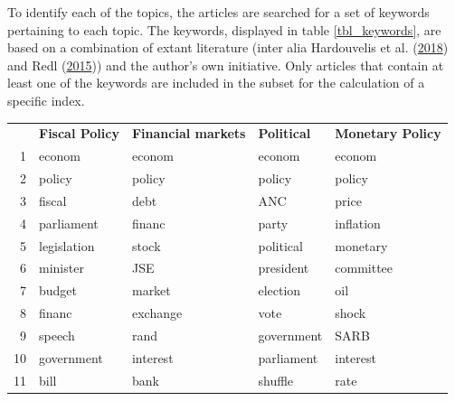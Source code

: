 \documentclass[11pt,preprint, authoryear]{elsarticle}
\let\origtable\table
\let\endorigtable\endtable
\renewenvironment{table}[1][2] {
    \expandafter\origtable\expandafter[H]
} {
    \endorigtable
}
\numberwithin{equation}{section}
\numberwithin{figure}{section}
\numberwithin{table}{section}
\begin{document}
To identify each of the topics, the articles are searched for a set of keywords
pertaining to each topic. The keywords, displayed in table
\ref{tbl_keywords}, are based on a combination of extant
literature (inter alia Hardouvelis et al.
(\protect\hyperlink{ref-Hardouvelis2018}{2018}) and Redl
(\protect\hyperlink{ref-Redl2015}{2015})) and the author's own initiative. Only
articles that contain at least one of the keywords are included in the
subset for the calculation of a specific index.

\begin{table}[H]\footnotesize
	\caption{Keywords per Index category \label{tbl_keywords}} 
	\centering
	\begin{tabular}{rlrrr}
		\cmidrule{2-5}          & \textbf{Fiscal Policy } & \multicolumn{1}{l}{\textbf{Financial markets }} & \multicolumn{1}{l}{\textbf{Political}} & \multicolumn{1}{l}{\textbf{Monetary Policy }} \\
		\cmidrule{2-5}    1     & econom & \multicolumn{1}{l}{econom} & \multicolumn{1}{l}{econom} & \multicolumn{1}{l}{econom} \\
		2     & policy & \multicolumn{1}{l}{policy} & \multicolumn{1}{l}{policy} & \multicolumn{1}{l}{policy} \\
		3     & fiscal & \multicolumn{1}{l}{debt} & \multicolumn{1}{l}{ANC} & \multicolumn{1}{l}{price} \\
		4     & parliament & \multicolumn{1}{l}{financ} & \multicolumn{1}{l}{party} & \multicolumn{1}{l}{inflation} \\
		5     & legislation & \multicolumn{1}{l}{stock} & \multicolumn{1}{l}{political} & \multicolumn{1}{l}{monetary} \\
		6     & minister & \multicolumn{1}{l}{JSE} & \multicolumn{1}{l}{president} & \multicolumn{1}{l}{committee} \\
		7     & budget & \multicolumn{1}{l}{market} & \multicolumn{1}{l}{election} & \multicolumn{1}{l}{oil} \\
		8     & financ & \multicolumn{1}{l}{exchange} & \multicolumn{1}{l}{vote} & \multicolumn{1}{l}{shock} \\
		9     & speech & \multicolumn{1}{l}{rand} & \multicolumn{1}{l}{government } & \multicolumn{1}{l}{SARB} \\
		10    & government & \multicolumn{1}{l}{interest} & \multicolumn{1}{l}{parliament} & \multicolumn{1}{l}{interest} \\
		11    & bill  & \multicolumn{1}{l}{bank } & \multicolumn{1}{l}{shuffle} & \multicolumn{1}{l}{rate} \\

\end{tabular}
\end{table}
\end{document}
